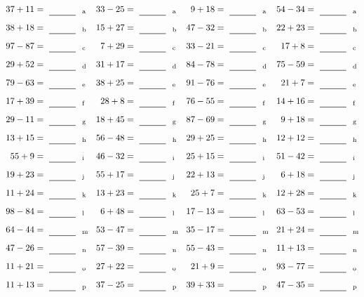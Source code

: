 \documentclass
[
  draft    = true,
  fontsize = 11pt,
  parskip  = half-
]
{scrartcl}
\begin{document}
\clearpage
\begin{align*}
    \pline{37+11}&=\rline{a}
  & \pline{33-25}&=\rline{a}
  & \pline{9+18}&=\rline{a}
  & \pline{54-34}&=\rline{a} \\[1ex]
    \pline{38+18}&=\rline{b}
  & \pline{15+27}&=\rline{b}
  & \pline{47-32}&=\rline{b}
  & \pline{22+23}&=\rline{b} \\[1ex]
    \pline{97-87}&=\rline{c}
  & \pline{7+29}&=\rline{c}
  & \pline{33-21}&=\rline{c}
  & \pline{17+8}&=\rline{c} \\[1ex]
    \pline{29+52}&=\rline{d}
  & \pline{31+17}&=\rline{d}
  & \pline{84-78}&=\rline{d}
  & \pline{75-59}&=\rline{d} \\[1ex]
    \pline{79-63}&=\rline{e}
  & \pline{38+25}&=\rline{e}
  & \pline{91-76}&=\rline{e}
  & \pline{21+7}&=\rline{e} \\[1ex]
    \pline{17+39}&=\rline{f}
  & \pline{28+8}&=\rline{f}
  & \pline{76-55}&=\rline{f}
  & \pline{14+16}&=\rline{f} \\[1ex]
    \pline{29-11}&=\rline{g}
  & \pline{18+45}&=\rline{g}
  & \pline{87-69}&=\rline{g}
  & \pline{9+18}&=\rline{g} \\[1ex]
    \pline{13+15}&=\rline{h}
  & \pline{56-48}&=\rline{h}
  & \pline{29+25}&=\rline{h}
  & \pline{12+12}&=\rline{h} \\[1ex]
    \pline{55+9}&=\rline{i}
  & \pline{46-32}&=\rline{i}
  & \pline{25+15}&=\rline{i}
  & \pline{51-42}&=\rline{i} \\[1ex]
    \pline{19+23}&=\rline{j}
  & \pline{55+17}&=\rline{j}
  & \pline{22+13}&=\rline{j}
  & \pline{6+18}&=\rline{j} \\[1ex]
    \pline{11+24}&=\rline{k}
  & \pline{13+23}&=\rline{k}
  & \pline{25+7}&=\rline{k}
  & \pline{12+28}&=\rline{k} \\[1ex]
    \pline{98-84}&=\rline{l}
  & \pline{6+48}&=\rline{l}
  & \pline{17-13}&=\rline{l}
  & \pline{63-53}&=\rline{l} \\[1ex]
    \pline{64-44}&=\rline{m}
  & \pline{53-47}&=\rline{m}
  & \pline{35-17}&=\rline{m}
  & \pline{21+24}&=\rline{m} \\[1ex]
    \pline{47-26}&=\rline{n}
  & \pline{57-39}&=\rline{n}
  & \pline{55-43}&=\rline{n}
  & \pline{11+13}&=\rline{n} \\[1ex]
    \pline{11+21}&=\rline{o}
  & \pline{27+22}&=\rline{o}
  & \pline{21+9}&=\rline{o}
  & \pline{93-77}&=\rline{o} \\[1ex]
    \pline{11+13}&=\rline{p}
  & \pline{37-25}&=\rline{p}
  & \pline{39+33}&=\rline{p}
  & \pline{47-35}&=\rline{p}
\end{align*}
\end{document}

